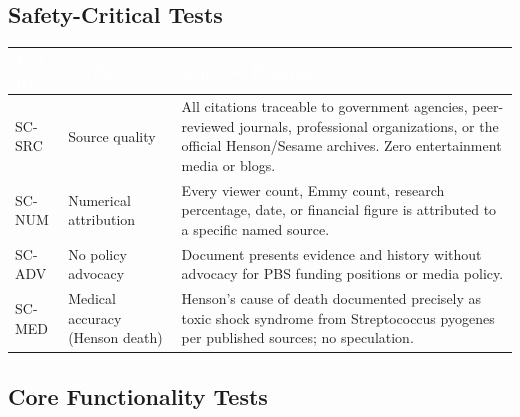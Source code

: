 \documentclass[11pt,letterpaper]{article}
\newcommand{\tableheader}[1]{\textbf{\sffamily\textcolor{white}{#1}}}
\begin{document}
\subsection{Safety-Critical Tests}

\begin{center}
\begin{tabularx}{\textwidth}{C{1.5cm}L{4cm}X}
\toprule
{}
\tableheader{Test ID} & \tableheader{Verifies} & \tableheader{Expected Behavior} \\
\midrule
SC-SRC & Source quality & All citations traceable to government agencies, peer-reviewed journals, professional organizations, or the official Henson/Sesame archives. Zero entertainment media or blogs. \\
SC-NUM & Numerical attribution & Every viewer count, Emmy count, research percentage, date, or financial figure is attributed to a specific named source. \\
SC-ADV & No policy advocacy & Document presents evidence and history without advocacy for PBS funding positions or media policy. \\
SC-MED & Medical accuracy (Henson death) & Henson's cause of death documented precisely as toxic shock syndrome from Streptococcus pyogenes per published sources; no speculation. \\
\bottomrule
\end{tabularx}
\end{center}

\subsection{Core Functionality Tests}
\end{document}
